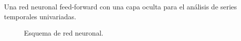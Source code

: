 	Una red neuronal feed-forward con una capa oculta para el an\'alisis de series temporales univariadas.
	
	\begin{figure}[H]
		\centering
		\textbf{}\par\medskip
		\caption{Esquema de red neuronal.}\label{fig6_1}
	\end{figure}
	
%
%
%
%
%
%
%
%
%
%
%


